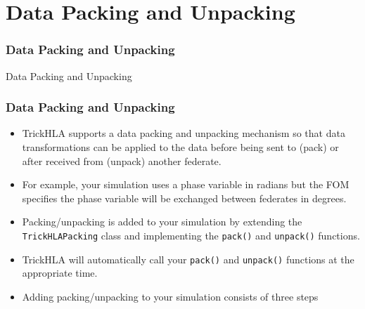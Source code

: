   
   \section{Data Packing and Unpacking}

   \begin{frame}
      \frametitle{Data Packing and Unpacking}
      \begin{center}
      \Huge{Data Packing and Unpacking}
      \end{center}
   \end{frame}
   
   \begin{frame}
      \frametitle{Data Packing and Unpacking}
      \begin{itemize}
         \item TrickHLA supports a data packing and unpacking mechanism so that
         data transformations can be applied to the data before being sent to
         (pack) or after received from (unpack) another federate.
         \item For example, your simulation uses a phase variable in radians but
         the FOM specifies the phase variable  will be exchanged between
         federates in degrees.
         \item Packing/unpacking is added to your simulation by extending the
         \texttt{TrickHLAPacking} class and implementing the \texttt{pack()}
         and \texttt{unpack()} functions.
         \item TrickHLA will automatically call your \texttt{pack()} and
         \texttt{unpack()}
         functions at the appropriate time.
         \item Adding packing/unpacking to your simulation consists of three
         steps \textellipsis
      \end{itemize}
   \end{frame}

